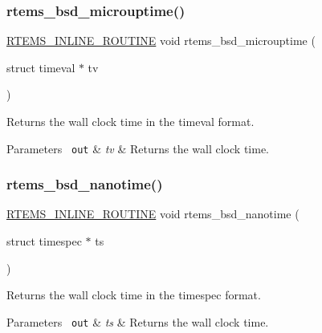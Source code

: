 \subsubsection{\texorpdfstring{rtems\_bsd\_microuptime()}{rtems\_bsd\_microuptime()}}
{\footnotesize\ttfamily \mbox{\hyperlink{group__RTEMSScoreBaseDefs_gac216239df231d5dbd15e3520b0b9313f}{R\+T\+E\+M\+S\+\_\+\+I\+N\+L\+I\+N\+E\+\_\+\+R\+O\+U\+T\+I\+NE}} void rtems\+\_\+bsd\+\_\+microuptime (\begin{DoxyParamCaption}\item[{struct timeval $\ast$}]{tv }\end{DoxyParamCaption})}



Returns the wall clock time in the timeval format. 


\begin{DoxyParams}[1]{Parameters}
\mbox{\texttt{ out}}  & {\em tv} & Returns the wall clock time. \\
\hline
\end{DoxyParams}
\mbox{\label{group__RTEMSAPIBSD_ga53f36f715035db077e3d0a75d44d9f75}} 
\subsubsection{\texorpdfstring{rtems\_bsd\_nanotime()}{rtems\_bsd\_nanotime()}}
{\footnotesize\ttfamily \mbox{\hyperlink{group__RTEMSScoreBaseDefs_gac216239df231d5dbd15e3520b0b9313f}{R\+T\+E\+M\+S\+\_\+\+I\+N\+L\+I\+N\+E\+\_\+\+R\+O\+U\+T\+I\+NE}} void rtems\+\_\+bsd\+\_\+nanotime (\begin{DoxyParamCaption}\item[{struct timespec $\ast$}]{ts }\end{DoxyParamCaption})}



Returns the wall clock time in the timespec format. 


\begin{DoxyParams}[1]{Parameters}
\mbox{\texttt{ out}}  & {\em ts} & Returns the wall clock time. \\
\hline
\end{DoxyParams}
\mbox{\label{group__RTEMSAPIBSD_gaf300e639d192c219a0a15398ccf515c9}} 
